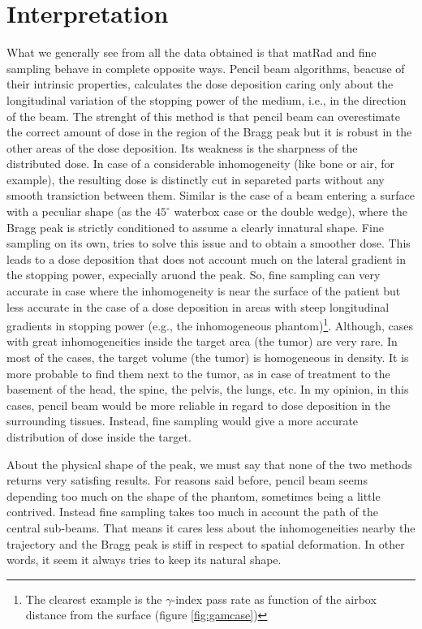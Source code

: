 \documentclass[12pt, a4paper, twoside]{book}
\begin{document}
\section{Interpretation}
What we generally see from all the data obtained is that matRad and fine sampling behave in complete opposite ways. Pencil beam algorithms, beacuse of their intrinsic properties, calculates the dose deposition caring only about the longitudinal variation of the stopping power of the medium, i.e., in the direction of the beam. The strenght of this method is that pencil beam can overestimate the correct amount of dose in the region of the Bragg peak but it is robust in the other areas of the dose deposition. Its weakness is the sharpness of the distributed dose. In case of a considerable inhomogeneity (like bone or air, for example), the resulting dose is distinctly cut in separeted parts without any smooth transiction between them. Similar is the case of a beam entering a surface with a peculiar shape (as the $45^\circ$ waterbox case or the double wedge), where the Bragg peak is strictly conditioned to assume a clearly innatural shape.
Fine sampling on its own, tries to solve this issue and to obtain a smoother dose. This leads to a dose deposition that does not account much on the lateral gradient in the stopping power, expecially aruond the peak.
So, fine sampling can very accurate in case where the inhomogeneity is near the surface of the patient but less accurate in the case of a dose deposition in areas with steep longitudinal gradients in stopping power (e.g., the inhomogeneous phantom)\footnote{The clearest example is the $\gamma$-index pass rate as function of the airbox distance from the surface (figure \ref{fig:gamcase})}. Although, cases with great inhomogeneities inside the target area (the tumor) are very rare. In most of the cases, the target volume (the tumor) is homogeneous in density. It is more probable to find them next to the tumor, as in case of treatment to the basement of the head, the spine, the pelvis, the lungs, etc. In my opinion, in this cases, pencil beam would be more reliable in regard to dose deposition in the surrounding tissues. Instead, fine sampling would give a more accurate distribution of dose inside the target.

About the physical shape of the peak, we must say that none of the two methods returns very satisfing results. For reasons said before, pencil beam seems depending too much on the shape of the phantom, sometimes being a little contrived. Instead fine sampling takes too much in account the path of the central sub-beams. That means it cares less about the inhomogeneities nearby the trajectory and the Bragg peak is stiff in respect to spatial deformation. In other words, it seem it always tries to keep its natural shape.
\end{document}
